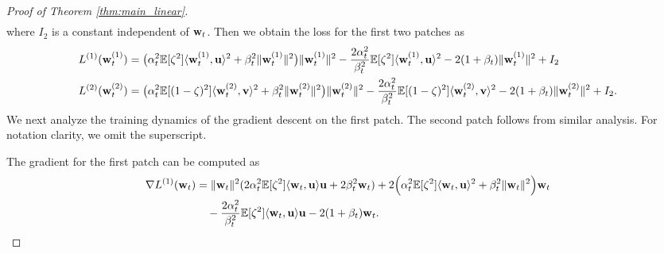 \begin{proof}[Proof of Theorem \ref{thm:main_linear}]
\begin{align*}
\end{align*}
where $I_2$ is a constant independent of ${\mathbf w}_t$. Then we obtain the loss for the first two patches as 
\begin{align*}
    &L^{(1)}({\mathbf w}_t^{(1)}) = \big( \alpha_t^2 {\mathbb{E}} [\zeta^2] \langle {\mathbf w}_t^{(1)}, {\mathbf u} \rangle^2 + \beta_t^2 \| {\mathbf w}_t^{(1)} \|^2 \big) \| {\mathbf w}_t^{(1)} \|^2 - \frac{2 \alpha_t^2}{\beta_t^2 } {\mathbb{E}} [\zeta^2] \langle {\mathbf w}_t^{(1)}, {\mathbf u} \rangle^2 - 2 (1 + \beta_t) \| {\mathbf w}_t^{(1)} \|^2 + I_2 \\
    &L^{(2)}({\mathbf w}_t^{(2)}) = \big( \alpha_t^2 {\mathbb{E}} [(1-\zeta)^2] \langle {\mathbf w}_t^{(2)}, {\mathbf v} \rangle^2 + \beta_t^2 \| {\mathbf w}_t^{(2)} \|^2 \big) \| {\mathbf w}_t^{(2)} \|^2 - \frac{2 \alpha_t^2}{\beta_t^2 } {\mathbb{E}} [(1-\zeta)^2] \langle {\mathbf w}_t^{(2)}, {\mathbf v} \rangle^2 - 2 (1 + \beta_t) \| {\mathbf w}_t^{(2)}\|^2 + I_2.
\end{align*}
We next analyze the training dynamics of the gradient descent on the first patch. The second patch follows from similar analysis. For notation clarity, we omit the superscript. 

The gradient for the first patch can be computed as
\begin{align*}
    \nabla L^{(1)}({\mathbf w}_t) &=  \| {\mathbf w}_t \|^2( 2\alpha_t^2 {\mathbb{E}} [\zeta^2] \langle {\mathbf w}_t, {\mathbf u} \rangle {\mathbf u} + 2\beta_t^2 {\mathbf w}_t ) + 2 \Big( \alpha_t^2 {\mathbb{E}} [\zeta^2] \langle {\mathbf w}_t, {\mathbf u} \rangle^2 + \beta_t^2 \| {\mathbf w}_t \|^2 \Big) {\mathbf w}_t \\
    &\quad - \frac{2\alpha_t^2}{\beta_t^2} {\mathbb{E}} [\zeta^2] \langle {\mathbf w}_t, {\mathbf u} \rangle {\mathbf u} - 2 (1 + \beta_t) {\mathbf w}_t.
\end{align*}


\end{proof}
